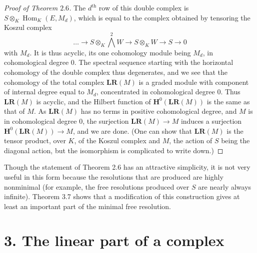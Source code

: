 \documentclass{tran-l}
\newcommand{\myHom}{\operatorname{Hom}}
\newcommand{\myth}{{\operatorname{th}}}
\newcommand{\myH}{\mathbf{H}}
\newcommand{\LL}{\mathbf{L}}
\newcommand{\RR}{\mathbf{R}}
\theoremstyle{plain}
\theoremstyle{remark}
\theoremstyle{definition}
\begin{document}
\begin{proof}[Proof of Theorem $2.6$]
The $d^{\myth }$ row of this double complex is $S\otimes _{K}\myHom _{K}(E,M_{d})$,
which is equal to the complex obtained by tensoring the
Koszul complex
\begin{equation*}\dots \to S\otimes _{K}{\textstyle{\bigwedge ^{2}}} W \to S\otimes _{K} W \to S \to 0
\end{equation*}
with $M_{d}$. It is thus acyclic, its one cohomology module being
$M_{d}$, in cohomological degree $0$. The spectral sequence
starting with the horizontal cohomology of the double complex
thus degenerates, and we see that the cohomology of the total
complex $\LL \RR (M)$ is a graded module with
component of internal degree equal to $M_{d}$,
concentrated in cohomological degree 0.
Thus
$\LL \RR (M)$ is acyclic, and the Hilbert
function of $\myH ^{0}(\LL \RR (M))$ is the same as that of $M$.
As $\LL \RR (M)$ has no terms in
positive cohomological degree, and $M$ is in cohomological degree 0,
the surjection $\LL \RR (M)\to M$ induces a surjection
$\myH ^{0}(\LL \RR (M))\to M$, and we are done. (One can show
that $\LL \RR (M)$ is the tensor product, over $K$,
of the Koszul complex and $M$, the action of $S$ being
the diagonal action, but the isomorphism is complicated
to write down.) \end{proof}


Though the statement of Theorem 2.6 has an attractive simplicity,
it is not very useful in this form because the resolutions that are
produced are highly nonminimal (for example, the free resolutions
produced over $S$ are nearly always infinite).
Theorem 3.7 shows that a modification of this construction gives at
least an important part of the minimal free resolution.

\section*{3. The linear part of a complex}
\end{document}
